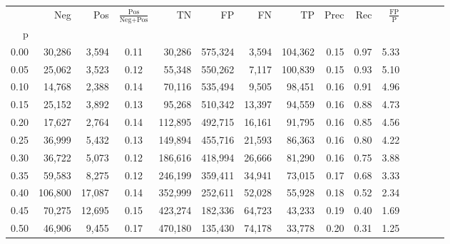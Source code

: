 \begin{tabular}{rrrcrrrrrrrrrrr}
\toprule
{} &      Neg &     Pos & $\frac{\text{Pos}}{\text{Neg}+\text{Pos}}$ &       TN &       FP &       FN &       TP &  Prec &   Rec & $\frac{\text{FP}}{\text{P}}$ \\
p    &          &         &                                            &          &          &          &          &       &       &                              \\
\midrule
0.00 &   30,286 &   3,594 &                                       0.11 &   30,286 &  575,324 &    3,594 &  104,362 &  0.15 &  0.97 &                         5.33 \\
0.05 &   25,062 &   3,523 &                                       0.12 &   55,348 &  550,262 &    7,117 &  100,839 &  0.15 &  0.93 &                         5.10 \\
0.10 &   14,768 &   2,388 &                                       0.14 &   70,116 &  535,494 &    9,505 &   98,451 &  0.16 &  0.91 &                         4.96 \\
0.15 &   25,152 &   3,892 &                                       0.13 &   95,268 &  510,342 &   13,397 &   94,559 &  0.16 &  0.88 &                         4.73 \\
0.20 &   17,627 &   2,764 &                                       0.14 &  112,895 &  492,715 &   16,161 &   91,795 &  0.16 &  0.85 &                         4.56 \\
0.25 &   36,999 &   5,432 &                                       0.13 &  149,894 &  455,716 &   21,593 &   86,363 &  0.16 &  0.80 &                         4.22 \\
0.30 &   36,722 &   5,073 &                                       0.12 &  186,616 &  418,994 &   26,666 &   81,290 &  0.16 &  0.75 &                         3.88 \\
0.35 &   59,583 &   8,275 &                                       0.12 &  246,199 &  359,411 &   34,941 &   73,015 &  0.17 &  0.68 &                         3.33 \\
0.40 &  106,800 &  17,087 &                                       0.14 &  352,999 &  252,611 &   52,028 &   55,928 &  0.18 &  0.52 &                         2.34 \\
0.45 &   70,275 &  12,695 &                                       0.15 &  423,274 &  182,336 &   64,723 &   43,233 &  0.19 &  0.40 &                         1.69 \\
0.50 &   46,906 &   9,455 &                                       0.17 &  470,180 &  135,430 &   74,178 &   33,778 &  0.20 &  0.31 &                         1.25 \\

\end{tabular}

